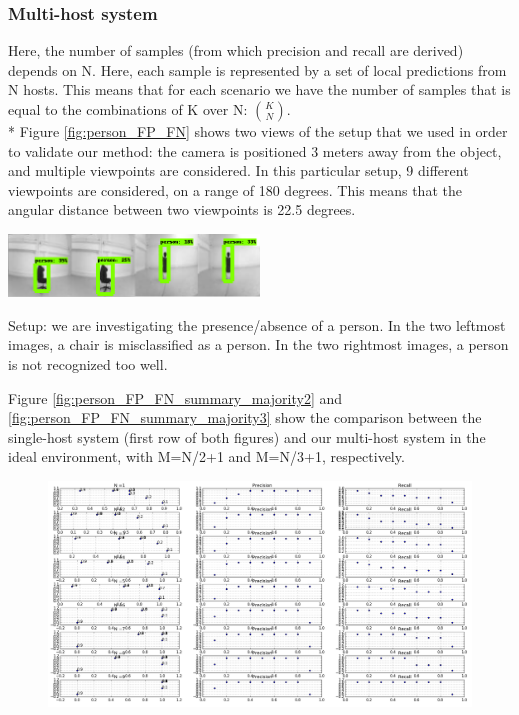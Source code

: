 \documentclass[10pt,conference,compsocconf]{IEEEtran}
\begin{document}
\begin{enumerate}
\subsubsection*{Multi-host system}
Here, the number of samples (from which precision and recall are derived) depends on N.
Here, each sample is represented by a set of local predictions from N hosts. This means that for each scenario we have the number of samples that is equal to the combinations of K over N: $\binom{K}{N}$.\\*
Figure \ref{fig:person_FP_FN} shows two views of the setup that we used in order to validate our method: the camera is positioned 3 meters away from the object, and multiple viewpoints are considered. In this particular setup, 9 different viewpoints are considered, on a range of 180 degrees. This means that the angular distance between two viewpoints is 22.5 degrees.
\begin{center}
	\captionsetup{type=figure}
	\includegraphics[width=0.5\textwidth]{img/person_FP_FN.png}
	\caption {Setup: we are investigating the presence/absence of a person. In the two leftmost images, a chair is misclassified as a person. In the two rightmost images, a person is not recognized too well.}
	\label{fig:person_FP_FN}
\end{center}
Figure \ref{fig:person_FP_FN_summary_majority2} and \ref{fig:person_FP_FN_summary_majority3} show the comparison between the single-host system (first row of both figures) and our multi-host system in the ideal environment, with M=N/2+1 and M=N/3+1, respectively.
\begin{figure}
	\includegraphics[width=\textwidth]{img/summary_majority_HALF_BIG.png}

\end{figure}
\end{enumerate}
\end{document}
